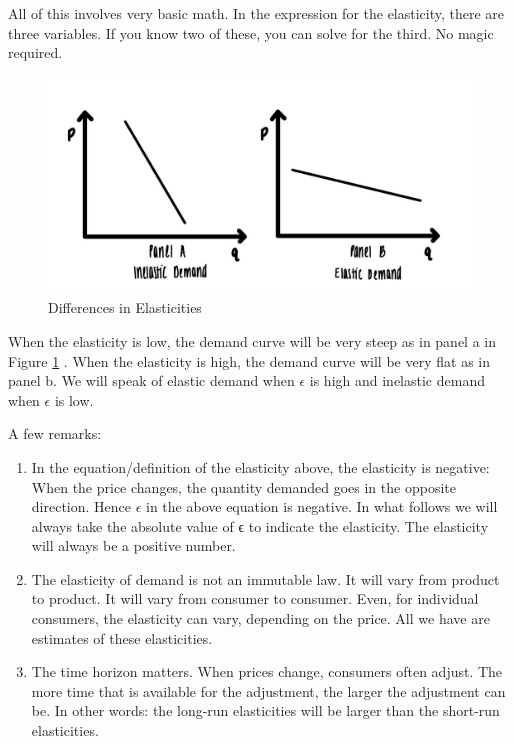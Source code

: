 \documentclass[
]{book}
\begin{document}
All of this involves very basic math. In the expression for the elasticity, there are three variables. If you know two of these, you can solve for the third. No magic required.

\begin{figure}

{\centering \includegraphics[width=1\linewidth]{img/demand/fig4} 

}

\caption{Differences in Elasticities}\label{fig:demand04}
\end{figure}

When the elasticity is low, the demand curve will be very steep as in panel a in Figure \ref{fig:demand04} . When the elasticity is high, the demand curve will be very flat as in panel b. We will speak of elastic demand when \(\epsilon\) is high and inelastic demand when \(\epsilon\) is low.

A few remarks:

\begin{enumerate}
\def\labelenumi{\arabic{enumi}.}
\item
  In the equation/definition of the elasticity above, the elasticity is negative: When the price changes, the quantity demanded goes in the opposite direction. Hence \(\epsilon\) in the above equation is negative. In what follows we will always take the absolute value of ϵ to indicate the elasticity. The elasticity will always be a positive number.
\item
  The elasticity of demand is not an immutable law. It will vary from product to product. It will vary from consumer to consumer. Even, for individual consumers, the elasticity can vary, depending on the price. All we have are estimates of these elasticities.
\item
  The time horizon matters. When prices change, consumers often adjust. The more time that is available for the adjustment, the larger the adjustment can be. In other words: the long-run elasticities will be larger than the short-run elasticities.
\end{enumerate}
\end{document}
